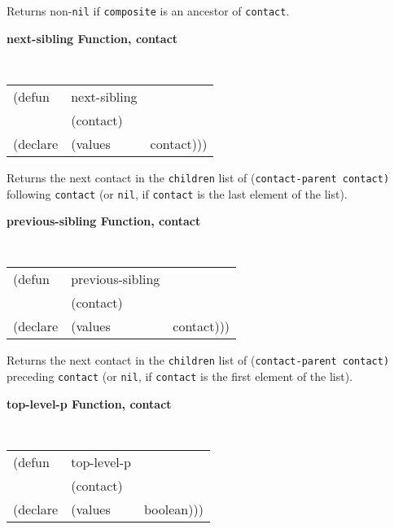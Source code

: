 \begin{flushright} \parbox[t]{6.125in}{
Returns non-{\tt nil} if {\tt composite} is an ancestor of {\tt contact}.

}\end{flushright}

{\samepage
{\large {\bf next-sibling \hfill Function, contact}} 
\begin{flushright} \parbox[t]{6.125in}{
\tt
\begin{tabular}{lll}
\raggedright
(defun & next-sibling & \\ 
& (contact) \\
(declare &(values  & contact)))
\end{tabular}
\rm

}\end{flushright}}

\begin{flushright} \parbox[t]{6.125in}{
Returns the next contact in the {\tt children} list of {(\tt contact-parent
contact)} following {\tt contact} (or {\tt nil}, if {\tt contact} is the last
element of the list).

}\end{flushright}

{\samepage
{\large {\bf previous-sibling \hfill Function, contact}} 
\begin{flushright} \parbox[t]{6.125in}{
\tt
\begin{tabular}{lll}
\raggedright
(defun & previous-sibling & \\ 
& (contact) \\
(declare &(values  & contact)))
\end{tabular}
\rm

}\end{flushright}}

\begin{flushright} \parbox[t]{6.125in}{
Returns the next contact in the {\tt children} list of {(\tt contact-parent
contact)} preceding {\tt contact} (or {\tt nil}, if {\tt contact} is the first
element of the list).

}\end{flushright}


{\samepage
{\large {\bf top-level-p \hfill Function, contact}} 
\begin{flushright} \parbox[t]{6.125in}{
\tt
\begin{tabular}{lll}
\raggedright
(defun & top-level-p & \\ 
& (contact) \\
(declare &(values  & boolean)))
\end{tabular}
\rm

}\end{flushright}}

